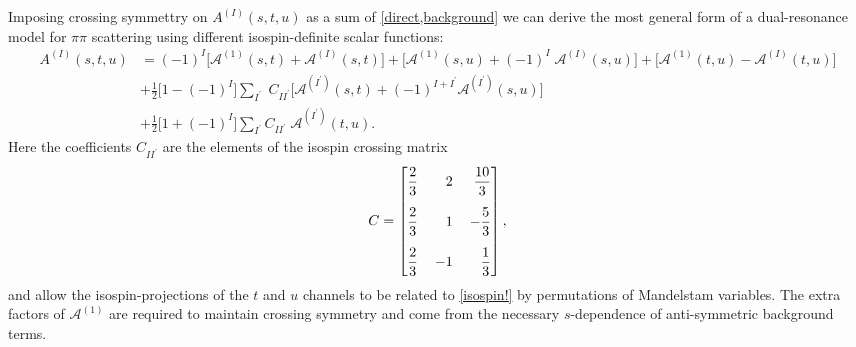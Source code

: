 \documentclass[aps,prd,amsmath,amssymb,superscriptaddress,onecolumn,
nofootinbib,showpacs,preprintnumbers]{revtex4-1}
\newcommand{\pp}{\pi\pi }
\newcommand{\maI}[1]{\mathcal{A}^{(#1)}}
\begin{document}
Imposing crossing symmettry on $A^{(I)}(s,t,u)$ as a sum of \cref{direct,background} we can derive the most general form of a dual-resonance model  for $\pp$ scattering using different isospin-definite scalar functions:
    \begin{align} \label{isospin!}
          A^{(I)}(s,t,u) &= (-1)^I \big[ \maI{1}(s,t) + \maI{I}(s,t) \big ] + \big [ \maI{1}(s,u) +  (-1)^I \; \maI{I}(s,u) \big ] + \big[ \maI{1}(t,u) - \maI{I}(t,u)\big] \nonumber \\
          &+ \frac{1}{2}  \big[1-(-1)^I\big]  \sum_{I^\prime}  \; C_{II^\prime} \bigg [ \maI{I^\prime}(s,t) + (-1)^{I+I^\prime} \maI{I^\prime}(s,u)\bigg]   \\
          &+ \frac{1}{2} \big[1 + (-1)^I] \sum_{I^\prime} C_{II^\prime}\;\maI{I^\prime}(t,u) \nonumber.
    \end{align}
Here the coefficients $C_{II^\prime}$ are the elements of the isospin crossing matrix 
	\begin{align}
	C= 
	\setlength\arraycolsep{6pt}
	 	\begin{bmatrix*}[r]
	 	\dfrac{2}{3} & 2 & \dfrac{10}{3} \\[1.2em]
	 	\dfrac{2}{3} & 1 & -\dfrac{5}{3} \\[1.2em]
	 	\dfrac{2}{3} & -1 & \dfrac{1}{3} 
	 	\end{bmatrix*},
	\end{align}
and allow the isospin-projections of the $t$ and $u$ channels to be related to \cref{isospin!} by permutations of Mandelstam variables.
 The extra factors of $\maI{1}$ are required to maintain crossing symmetry and come from the necessary $s$-dependence of anti-symmetric background terms. 
 
\end{document}
